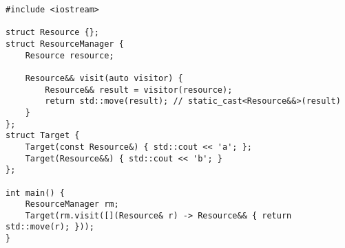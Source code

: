 \begin{lstlisting}[title=\href{https://godbolt.org/z/gPjzkF}{\texttt{godbolt.org/z/gPjzkF}}]
#include <iostream>

struct Resource {};
struct ResourceManager {
    Resource resource;

    Resource&& visit(auto visitor) {
        Resource&& result = visitor(resource);
        return std::move(result); // static_cast<Resource&&>(result)
    }
};
struct Target {
    Target(const Resource&) { std::cout << 'a'; };
    Target(Resource&&) { std::cout << 'b'; }
};

int main() {
    ResourceManager rm;
    Target(rm.visit([](Resource& r) -> Resource&& { return std::move(r); }));
}
\end{lstlisting}
